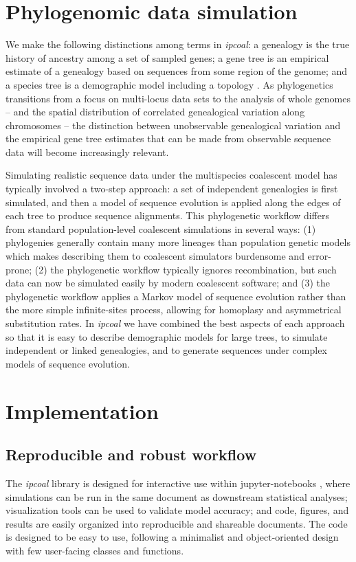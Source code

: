 \documentclass[11pt]{article}
\begin{document}
\section{Phylogenomic data simulation}
We make the following distinctions among terms in \emph{ipcoal}: a genealogy is the true history of ancestry among a set of sampled genes; a gene tree is an empirical estimate of a genealogy based on sequences from some region of the genome; and a species tree is a demographic model including a topology \citep{pamilo_relationships_1988,maddison_gene_1997}. As phylogenetics transitions from a focus on multi-locus data sets \citep{knowles_estimating_2011} to the analysis of whole genomes -- and the spatial distribution of correlated genealogical variation along chromosomes -- the distinction between unobservable genealogical variation and the empirical gene tree estimates that can be made from observable sequence data will become increasingly relevant. 

Simulating realistic sequence data under the multispecies coalescent model has typically involved a two-step approach: a set of independent genealogies is first simulated, and then a model of sequence evolution is applied along the edges of each tree to produce sequence alignments. This phylogenetic workflow differs from standard population-level coalescent simulations in several ways: (1) phylogenies generally contain many more lineages than population genetic models which makes describing them to coalescent simulators burdensome and error-prone; (2) the phylogenetic workflow typically ignores recombination, but such data can now be simulated easily by modern coalescent software; and (3) the phylogenetic workflow applies a Markov model of sequence evolution rather than the more simple infinite-sites process, allowing for homoplasy and asymmetrical substitution rates. In \emph{ipcoal} we have combined the best aspects of each approach so that it is easy to describe demographic models for large trees, to simulate independent or linked genealogies, and to generate sequences under complex models of sequence evolution. 

\section{Implementation}
\label{sec:headings}
\subsection{Reproducible and robust workflow}
The \emph{ipcoal} library is designed for interactive use within jupyter-notebooks \citep{kluyver_jupyter_2016}, where simulations can be run in the same document as downstream statistical analyses; visualization tools can be used to validate model accuracy; and code, figures, and results are easily organized into reproducible and shareable documents. The code is designed to be easy to use, following a minimalist and object-oriented design with few user-facing classes and functions.
\end{document}
